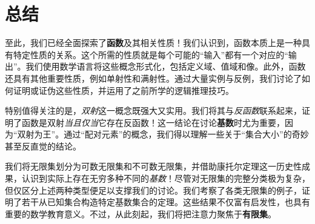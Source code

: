 \section{总结}

至此，我们已经全面探索了\textbf{函数}及其相关性质！我们认识到，函数本质上是一种具有特定性质的关系。这个所需的性质就是每个可能的``输入''都有一个对应的``输出''。我们使用数学语言将这些概念形式化，包括定义域、值域和像。此外，函数还具有其他重要性质，例如单射性和满射性。通过大量实例与反例，我们讨论了如何证明或证伪这些性质，并运用了之前所学的逻辑推理技巧。

特别值得关注的是，\emph{双射}这一概念既强大又实用。我们将其与\emph{反函数}联系起来，证明了函数是双射\emph{当且仅当}它存在反函数！这一结论在讨论\textbf{基数}时尤为重要，因为``双射为王''。通过``配对元素''的概念，我们得以理解一些关于``集合大小''的奇妙甚至反直觉的结论。

我们将无限集划分为可数无限集和不可数无限集，并借助康托尔定理这一历史性成果，认识到实际上存在无穷多种不同的\emph{基数}！尽管对无限集的完整分类极为复杂，但仅区分上述两种类型便足以支撑我们的讨论。我们考察了各类无限集的例子，证明了若干从已知集合构造特定基数集合的定理。这些结果不仅富有启发性，也具有重要的数学教育意义。不过，从此刻起，我们将把注意力聚焦于\textbf{有限集}。
